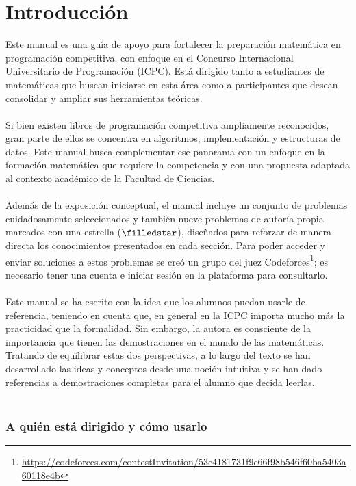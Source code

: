 \chapter{Introducción}

Este manual es una guía de apoyo para fortalecer la preparación matemática en programación competitiva, con enfoque en el Concurso Internacional Universitario de Programación (ICPC). Está dirigido tanto a estudiantes de matemáticas que buscan iniciarse en esta área como a participantes que desean consolidar y ampliar sus herramientas teóricas.
\\\\
Si bien existen libros de programación competitiva ampliamente reconocidos, gran parte de ellos se concentra en algoritmos, implementación y estructuras de datos. Este manual busca complementar ese panorama con un enfoque en la formación matemática que requiere la competencia y con una propuesta adaptada al contexto académico de la Facultad de Ciencias.
\\\\
Además de la exposición conceptual, el manual incluye un conjunto de problemas cuidadosamente seleccionados y también nueve problemas de autoría propia marcados con una estrella ($\filledstar$), diseñados para reforzar de manera directa los conocimientos presentados en cada sección. Para poder acceder y enviar soluciones a estos problemas se creó un grupo del juez \href{https://codeforces.com/contestInvitation/53c4181731f9e66f98b546f60ba5403a60118e4b}{Codeforces}\footnote{\url{https://codeforces.com/contestInvitation/53c4181731f9e66f98b546f60ba5403a60118e4b}}; es necesario tener una cuenta e iniciar sesión en la plataforma para consultarlo.
\\\\
Este manual se ha escrito con la idea que los alumnos puedan usarle de referencia, teniendo en cuenta que, en general en la ICPC importa mucho más la practicidad que la formalidad. Sin embargo, la autora es consciente de la importancia que tienen las demostraciones en el mundo de las matemáticas. Tratando de equilibrar estas dos perspectivas, a lo largo del texto se han desarrollado las ideas y conceptos desde una noción intuitiva y se han dado referencias a demostraciones completas para el alumno que decida leerlas.
\\\\
\subsection*{A quién está dirigido y cómo usarlo}

